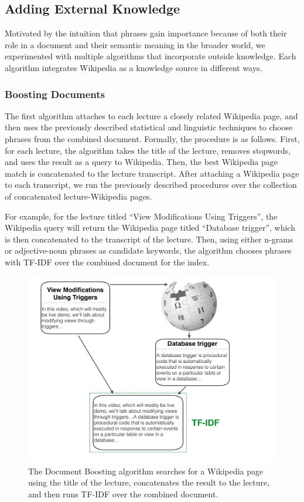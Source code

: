 \subsection{Adding External Knowledge}
\label{sec:wiki}


Motivated by the intuition that phrases gain importance because of both their role in a document and their semantic meaning in the broader world, we experimented with multiple algorithms that incorporate outside knowledge. Each algorithm integrates Wikipedia as a knowledge source in different ways.

\subsubsection{Boosting Documents}

The first algorithm attaches to each lecture a closely related Wikipedia page, and then uses the previously described statistical and linguistic techniques to choose phrases from the combined document. Formally, the procedure is as follows. First, for each lecture, the algorithm takes the title of the lecture, removes stopwords, and uses the result as a query to Wikipedia. Then, the best Wikipedia page match is concatenated to the lecture transcript. After attaching a Wikipedia page to each transcript, we run the previously described procedures over the collection of concatenated lecture-Wikipedia pages.

For example, for the lecture titled ``View Modifications Using
Triggers'', the Wikipedia query will return the Wikipedia page titled
``Database trigger'', which is then concatenated to the transcript of
the lecture. Then, using either n-grams or adjective-noun phrases as
candidate keywords, the algorithm chooses phrases with TF-IDF over the
combined document for the index.

\begin{figure}[h!]
\caption{The Document Boosting algorithm searches for a Wikipedia page using the title of the lecture, concatenates the result to the lecture, and then runs TF-IDF over the combined document.}
\includegraphics[width=\textwidth]{document_boosting.pdf}
\end{figure}


